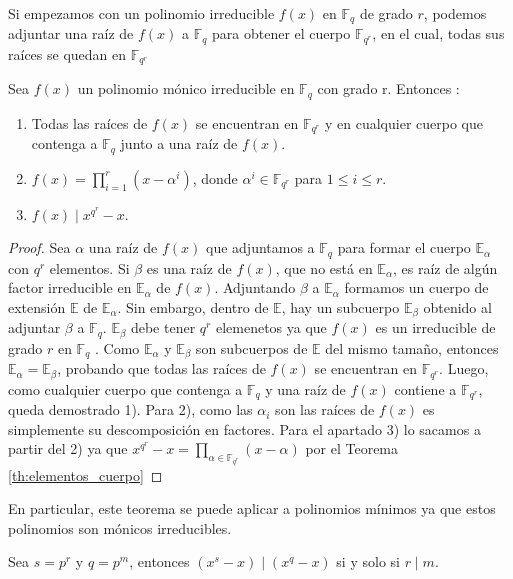 Si empezamos con un polinomio irreducible $f(x)$ en $\mathbb{F}_q$ de grado $r$, podemos adjuntar una raíz de $f(x)$ a $\mathbb{F}_q$ para obtener el cuerpo $\mathbb{F}_{q^r}$, en el cual, todas sus raíces se quedan en $\mathbb{F}_{q^r}$ 

\begin{theorem}
\label{th:raices_minimo}
Sea $f(x)$ un polinomio mónico irreducible en $\mathbb{F}_q$ con grado r. Entonces :
\begin{enumerate}
	\item Todas las raíces de $f(x)$ se encuentran en $\mathbb{F}_{q^r}$ y en cualquier cuerpo que contenga a $\mathbb{F}_q$ junto a una raíz de $f(x)$.
	\item $f(x) = \prod_{i=1}^r (x - \alpha^i)$, donde $\alpha^i \in \mathbb{F}_{q^r}$ para $ 1 \leq i \leq r$.
	\item $f(x) \mid x^{q^r}-x$.
\end{enumerate}
\end{theorem}

\begin{proof}
Sea $\alpha$ una raíz de $f(x)$ que adjuntamos a $\mathbb{F}_q$ para formar el cuerpo $\mathbb{E}_\alpha$ con $q^r$ elementos. Si $\beta$ es una raíz de $f(x)$, que no está en $\mathbb{E}_\alpha$, es raíz de algún factor irreducible en $\mathbb{E}_\alpha$ de $f(x)$. Adjuntando $\beta$ a $\mathbb{E}_\alpha$ formamos un cuerpo de extensión $\mathbb{E}$ de $\mathbb{E}_\alpha$. Sin embargo, dentro de $\mathbb{E}$, hay un subcuerpo $\mathbb{E}_\beta$ obtenido al adjuntar $\beta$ a $\mathbb{F}_q$. $\mathbb{E}_\beta$ debe tener $q^r$ elemenetos ya que $f(x)$ es un irreducible de grado $r$ en $\mathbb{F}_q$
. Como $\mathbb{E}_\alpha$ y $\mathbb{E}_\beta$ son subcuerpos de $\mathbb{E}$ del mismo tamaño, entonces $\mathbb{E}_\alpha = \mathbb{E}_\beta$, probando que todas las raíces de $f(x)$ se encuentran en $\mathbb{F}_{q^r}$. Luego, como cualquier cuerpo que contenga a $\mathbb{F}_q$ y una raíz de $f(x)$ contiene a $\mathbb{F}_{q^r}$, queda demostrado 1). Para 2), como las $\alpha_i$ son las raíces de $f(x)$ es simplemente su descomposición en factores. Para el apartado 3) lo sacamos a partir del 2) ya que $x^{q^r}-x = \prod_{\alpha \in \mathbb{F}_{q^r}} (x - \alpha)$ por el Teorema \ref{th:elementos_cuerpo}
\end{proof}
 

En particular, este teorema se puede aplicar a polinomios mínimos ya que estos polinomios son mónicos irreducibles.

\begin{lemma}
\label{le:divisible}
Sea $s = p^r$ y $q = p^m$, entonces $(x^s-x) \mid (x^q-x)$ si y solo si $r \mid m $.
\end{lemma}

